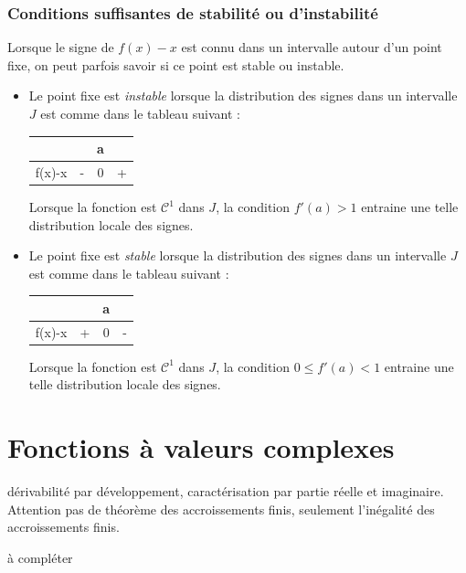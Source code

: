 \subsubsection{Conditions suffisantes de stabilité ou d'instabilité}
Lorsque le signe de $f(x)-x$ est connu dans un intervalle autour d'un point fixe, on peut parfois savoir si ce point est stable ou instable.
\begin{itemize}
 \item Le point fixe est \emph{instable} lorsque la distribution des signes dans un intervalle $J$ est comme dans le tableau suivant :
\begin{center}
\renewcommand{\arraystretch}{1.5}
 \begin{tabular}{|c|ccc|}\hline
   &  & a &  \\  \hline
 f(x)-x   & - & 0 & + \\ \hline
\end{tabular}
\end{center}\bigskip
Lorsque la fonction est $\mathcal C^1$ dans $J$, la condition $f'(a)>1$ entraine une telle distribution locale des signes.

 \item Le point fixe est \emph{stable} lorsque la distribution des signes dans un intervalle $J$ est comme dans le tableau suivant :
\begin{center}
\renewcommand{\arraystretch}{1.5}
 \begin{tabular}{|c|ccc|}\hline
   &  & a &  \\  \hline
 f(x)-x   & + & 0 & - \\ \hline
\end{tabular}
\end{center}\bigskip
Lorsque la fonction est $\mathcal C^1$ dans $J$, la condition $0\leq f'(a) < 1$ entraine une telle distribution locale des signes.
\end{itemize}

\section{Fonctions à valeurs complexes}
dérivabilité par développement, caractérisation par partie réelle et imaginaire.\newline
Attention pas de théorème des accroissements finis, seulement l'inégalité des accroissements finis.

à compléter


